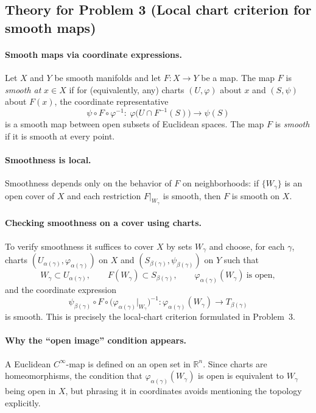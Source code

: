 \documentclass[12pt,a4paper]{article}
\theoremstyle{plain}
\theoremstyle{definition}      %
\begin{document}

\subsection*{Theory for Problem 3 (Local chart criterion for smooth maps)}

\paragraph{Smooth maps via coordinate expressions.}
Let $X$ and $Y$ be smooth manifolds and let $F:X\to Y$ be a map.
The map $F$ is \emph{smooth at} $x\in X$ if for (equivalently, any) charts $(U,\varphi)$ about $x$
and $(S,\psi)$ about $F(x)$, the coordinate representative
\[
\psi\circ F\circ \varphi^{-1}:\ \varphi\!\big(U\cap F^{-1}(S)\big)\longrightarrow \psi(S)
\]
is a smooth map between open subsets of Euclidean spaces.
The map $F$ is \emph{smooth} if it is smooth at every point.

\paragraph{Smoothness is local.}
Smoothness depends only on the behavior of $F$ on neighborhoods:
if $\{W_\gamma\}$ is an open cover of $X$ and each restriction $F|_{W_\gamma}$ is smooth,
then $F$ is smooth on $X$.

\paragraph{Checking smoothness on a cover using charts.}
To verify smoothness it suffices to cover $X$ by sets $W_\gamma$ and choose, for each $\gamma$,
charts $(U_{\alpha(\gamma)},\varphi_{\alpha(\gamma)})$ on $X$ and $(S_{\beta(\gamma)},\psi_{\beta(\gamma)})$ on $Y$
such that
\[
W_\gamma\subset U_{\alpha(\gamma)},\qquad F(W_\gamma)\subset S_{\beta(\gamma)},
\qquad \varphi_{\alpha(\gamma)}(W_\gamma)\ \text{is open},
\]
and the coordinate expression
\[
\psi_{\beta(\gamma)}\circ F\circ \big(\varphi_{\alpha(\gamma)}|_{W_\gamma}\big)^{-1}:
\varphi_{\alpha(\gamma)}(W_\gamma)\to T_{\beta(\gamma)}
\]
is smooth. This is precisely the local-chart criterion formulated in Problem~3.

\paragraph{Why the ``open image'' condition appears.}
A Euclidean $C^\infty$-map is defined on an open set in $\mathbb R^n$.
Since charts are homeomorphisms, the condition that $\varphi_{\alpha(\gamma)}(W_\gamma)$ is open
is equivalent to $W_\gamma$ being open in $X$, but phrasing it in coordinates avoids mentioning the topology explicitly.
\end{document}
